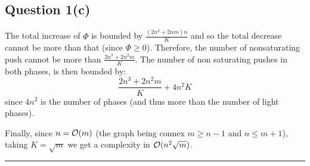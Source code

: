 \documentclass[math]{cours}
\begin{document}
\subsection{Question 1(c)}
The total increase of $\Phi$ is bounded by $\frac{(2n^{2} + 2nm)n}{K}$ and so the total decrease cannot be more than that (since $\Phi \geq 0$).
Therefore, the number of nonsaturating push cannot be more than $\frac{2n^{3} + 2n^{2}m}{K}$.
The number of non saturating pushes in both phases, is then bounded by:
\begin{equation*}
	\frac{2n^{3} + 2n^{2}m}{K} + 4n^{2}K
\end{equation*}
since $4n^{2}$ is the number of phases (and thus more than the number of light phases).

Finally, since $n = \mathcal{O}(m)$ (the graph being connex $m \geq n - 1$ and $n \leq m + 1$), taking $K = \sqrt{m}$ we get a complexity in $\mathcal{O}(n^{2}\sqrt{m})$.

\hrule
\end{document}
